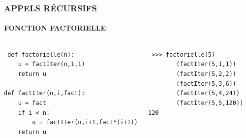 \begin{frame}
\frametitle{\uppercase{Appels récursifs}}
\framesubtitle{\uppercase{Fonction factorielle}}
\begin{columns}[T]
\column{6.4cm}
\begin{py}{6.4cm}\tt
def factorielle(n):\\
\mbox{}\ \ \ \ u = factIter(n,1,1)\\
\mbox{}\ \ \ \ return u\\
\mbox{}\\%
def factIter(n,i,fact):\\
\mbox{}\ \ \ \ u = fact\\
\mbox{}\ \ \ \ if i < n:\\
\mbox{}\ \ \ \ \ \ \ \ u = factIter(n,i+1,fact*(i+1))\\
\mbox{}\ \ \ \ return u
\end{py}
\column{4.5cm}
\begin{py}{4.5cm}\tt
\alert{>{>}> factorielle(5)}\\%
\mbox{}\ \ \ \ \ \ \ \ (factIter(5,1,1))\\%
\mbox{}\ \ \ \ \ \ \ \ (factIter(5,2,2))\\%
\mbox{}\ \ \ \ \ \ \ \ (factIter(5,3,6))\\%
\mbox{}\ \ \ \ \ \ \ \ (factIter(5,4,24))\\%
\mbox{}\ \ \ \ \ \ \ \ (factIter(5,5,120))\\%
\alert{120}
\end{py}
\end{columns}

\end{frame}
